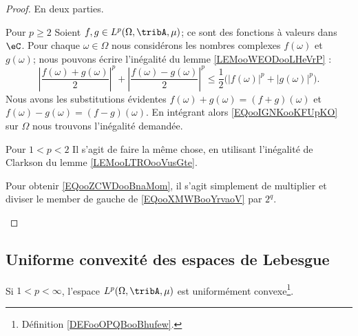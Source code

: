 \begin{proof}
    En deux parties.
    \begin{subproof}
        \item[Pour \( p\geq 2\)]
            Soient \( f,g\in L^p(\Omega,\tribA,\mu)\); ce sont des fonctions à valeurs dans \( \eC\). Pour chaque \( \omega\in \Omega\) nous considérons les nombres complexes \( f(\omega)\) et \( g(\omega)\); nous pouvons écrire l'inégalité du lemme \ref{LEMooWEODooLHeVrP} :
            \begin{equation}        \label{EQooIGNKooKFUpKO}
                \left| \frac{ f(\omega)+g(\omega) }{2} \right|^p+\left| \frac{ f(\omega)-g(\omega) }{2} \right|^p\leq \frac{ 1 }{2}\big( | f(\omega) |^p+| g(\omega) |^p \big).
            \end{equation}
            Nous avons les substitutions évidentes \( f(\omega)+g(\omega)=(f+g)(\omega)\) et \( f(\omega)-g(\omega)=(f-g)(\omega)\). En intégrant alors \eqref{EQooIGNKooKFUpKO} sur \( \Omega\) nous trouvons l'inégalité demandée.
        \item[Pour \( 1<p<2\)]
            Il s'agit de faire la même chose, en utilisant l'inégalité de Clarkson du lemme \ref{LEMooLTROooVusGte}.

            Pour obtenir \eqref{EQooZCWDooBnaMom}, il s'agit simplement de multiplier et diviser le member de gauche de \eqref{EQooXMWBooYrvaoV} par \( 2^q\).
    \end{subproof}
\end{proof}

\subsection{Uniforme convexité des espaces de Lebesgue}

\begin{proposition}     \label{PROPooFNLJooDlyIKV}
    Si \( 1<p<\infty\), l'espace \( L^p(\Omega,\tribA, \mu)\) est uniformément convexe\footnote{Définition \ref{DEFooOPQBooBhufew}.}.
\end{proposition}


